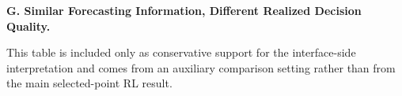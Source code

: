 \documentclass[10pt,twocolumn]{article}
\begin{document}
\noindent\textbf{G. Similar Forecasting Information, Different Realized Decision Quality.}
\par\smallskip
This table is included only as conservative support for the interface-side interpretation and comes from an auxiliary comparison setting rather than from the main selected-point RL result.
\par\smallskip
\begin{table}[H]
\centering
\scriptsize
\resizebox{\columnwidth}{!}{}
\caption{Forecast-side movement remains small while decision-side movement is large in the positive-cost rows of the auxiliary support package. These deltas are not intended to be compared numerically with the selected-point RL deltas in Table~\ref{tab:rl-main}. Only metric-level similarity is established here, so the table does not claim exact forecast identity.}
\label{tab:same-forecast-app}
\end{table}
\end{document}
